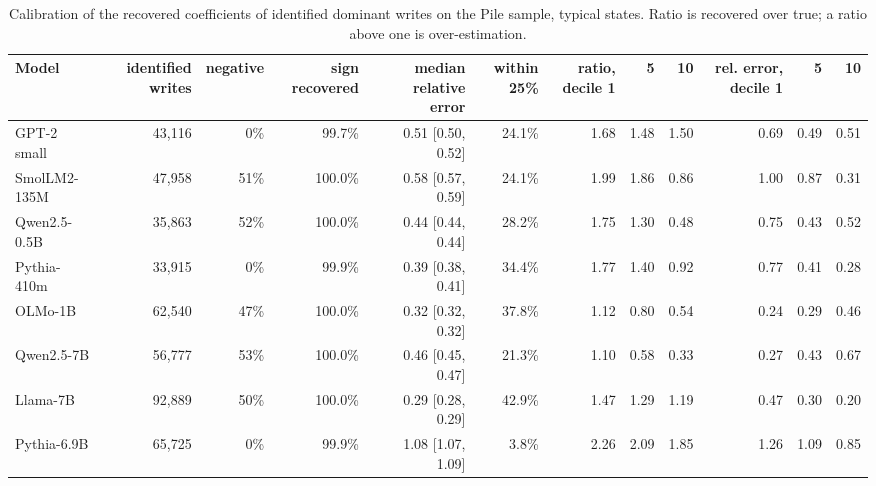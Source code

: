 \begin{table}[H]\centering\scriptsize
\caption{Calibration of the recovered coefficients of identified dominant writes on the Pile sample, typical states. Ratio is recovered over true; a ratio above one is over-estimation.}\label{app:ci-calib-pile}
\begin{adjustbox}{max width=\linewidth}
\begin{tabular}{lrrrrrrrrrrr}\toprule
Model & identified writes & negative & sign recovered & median relative error & within 25\% & ratio, decile 1 & 5 & 10 & rel. error, decile 1 & 5 & 10 \\ \midrule
GPT-2 small & 43,116 & 0\% & 99.7\% & 0.51 [0.50, 0.52] & 24.1\% & 1.68 & 1.48 & 1.50 & 0.69 & 0.49 & 0.51 \\
SmolLM2-135M & 47,958 & 51\% & 100.0\% & 0.58 [0.57, 0.59] & 24.1\% & 1.99 & 1.86 & 0.86 & 1.00 & 0.87 & 0.31 \\
Qwen2.5-0.5B & 35,863 & 52\% & 100.0\% & 0.44 [0.44, 0.44] & 28.2\% & 1.75 & 1.30 & 0.48 & 0.75 & 0.43 & 0.52 \\
Pythia-410m & 33,915 & 0\% & 99.9\% & 0.39 [0.38, 0.41] & 34.4\% & 1.77 & 1.40 & 0.92 & 0.77 & 0.41 & 0.28 \\
OLMo-1B & 62,540 & 47\% & 100.0\% & 0.32 [0.32, 0.32] & 37.8\% & 1.12 & 0.80 & 0.54 & 0.24 & 0.29 & 0.46 \\
Qwen2.5-7B & 56,777 & 53\% & 100.0\% & 0.46 [0.45, 0.47] & 21.3\% & 1.10 & 0.58 & 0.33 & 0.27 & 0.43 & 0.67 \\
Llama-7B & 92,889 & 50\% & 100.0\% & 0.29 [0.28, 0.29] & 42.9\% & 1.47 & 1.29 & 1.19 & 0.47 & 0.30 & 0.20 \\
Pythia-6.9B & 65,725 & 0\% & 99.9\% & 1.08 [1.07, 1.09] & 3.8\% & 2.26 & 2.09 & 1.85 & 1.26 & 1.09 & 0.85 \\
\bottomrule\end{tabular}\end{adjustbox}
\end{table}
